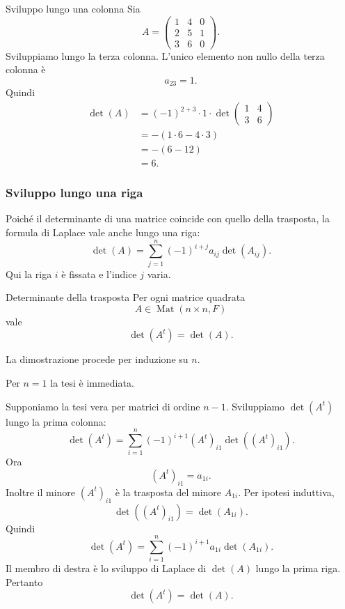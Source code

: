 \documentclass[a4paper]{article}
\begin{document}
\begin{snippetexample}{Sviluppo lungo una colonna}
    Sia
    \[
        A=
        \begin{pmatrix}
            1 & 4 & 0\\
            2 & 5 & 1\\
            3 & 6 & 0
        \end{pmatrix}.
    \]
    Sviluppiamo lungo la terza colonna. L'unico elemento non nullo della terza colonna è
    \[
        a_{23}=1.
    \]
    Quindi
    \begin{align*}
        \det(A)
        &=
        (-1)^{2+3}\cdot 1\cdot
        \det
        \begin{pmatrix}
            1 & 4\\
            3 & 6
        \end{pmatrix}\\
        &=
        -
        (1\cdot 6-4\cdot 3)\\
        &=
        -(6-12)\\
        &=
        6.
    \end{align*}
\end{snippetexample}

\subsubsection{Sviluppo lungo una riga}

Poiché il determinante di una matrice coincide con quello della trasposta, la formula di Laplace vale anche lungo una riga:
\[
    \det(A)
    =
    \sum_{j=1}^{n}
    (-1)^{i+j}a_{ij}\det(A_{ij}).
\]
Qui la riga \(i\) è fissata e l'indice \(j\) varia.

\begin{snippetproposition}{Determinante della trasposta}
    Per ogni matrice quadrata
    \[
        A\in\operatorname{Mat}(n\times n,F)
    \]
    vale
    \[
        \det(A^t)=\det(A).
    \]
\end{snippetproposition}

\begin{snippetproof}{}
    La dimostrazione procede per induzione su \(n\).

    Per \(n=1\) la tesi è immediata.

    Supponiamo la tesi vera per matrici di ordine \(n-1\). Sviluppiamo \(\det(A^t)\) lungo la prima colonna:
    \[
        \det(A^t)
        =
        \sum_{i=1}^{n}
        (-1)^{i+1}(A^t)_{i1}\det((A^t)_{i1}).
    \]
    Ora
    \[
        (A^t)_{i1}=a_{1i}.
    \]
    Inoltre il minore \((A^t)_{i1}\) è la trasposta del minore \(A_{1i}\). Per ipotesi induttiva,
    \[
        \det((A^t)_{i1})=\det(A_{1i}).
    \]
    Quindi
    \[
        \det(A^t)
        =
        \sum_{i=1}^{n}
        (-1)^{i+1}a_{1i}\det(A_{1i}).
    \]
    Il membro di destra è lo sviluppo di Laplace di \(\det(A)\) lungo la prima riga. Pertanto
    \[
        \det(A^t)=\det(A).
    \]
\end{snippetproof}
\end{document}
